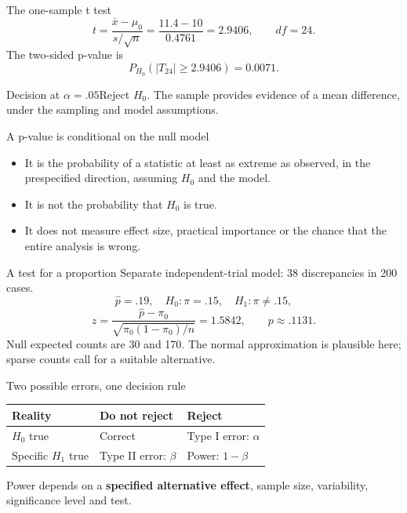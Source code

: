 \begin{frame}{The one-sample t test}
\[
t=\frac{\bar x-\mu_0}{s/\sqrt n}
=\frac{11.4-10}{0.4761}=2.9406,\qquad df=24.
\]
The two-sided p-value is
\[
P_{H_0}(|T_{24}|\ge2.9406)=0.0071.
\]
\begin{block}{Decision at $\alpha=.05$}Reject $H_0$. The sample provides evidence of a mean difference, under the sampling and model assumptions.\end{block}
\end{frame}
\begin{frame}{A p-value is conditional on the null model}
\begin{itemize}
\item It is the probability of a statistic at least as extreme as observed, in the prespecified direction, assuming $H_0$ and the model.
\item It is not the probability that $H_0$ is true.
\item It does not measure effect size, practical importance or the chance that the entire analysis is wrong.
\end{itemize}
\end{frame}
\begin{frame}{A test for a proportion}
Separate independent-trial model: 38 discrepancies in 200 cases.
\[
\hat p=.19,\quad H_0:\pi=.15,\quad H_1:\pi\ne.15,
\]
\[
z=\frac{\hat p-\pi_0}{\sqrt{\pi_0(1-\pi_0)/n}}
=1.5842,\qquad p\approx .1131.
\]
Null expected counts are 30 and 170. The normal approximation is plausible here; sparse counts call for a suitable alternative.
\end{frame}
\begin{frame}{Two possible errors, one decision rule}
\begin{center}\begin{tabular}{lll}\toprule
Reality & Do not reject & Reject\\\midrule
$H_0$ true & Correct & Type I error: $\alpha$\\
Specific $H_1$ true & Type II error: $\beta$ & Power: $1-\beta$\\\bottomrule
\end{tabular}\end{center}
Power depends on a \textbf{specified alternative effect}, sample size, variability, significance level and test.
\end{frame}
